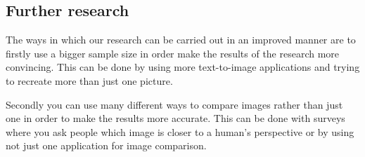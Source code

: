 \documentclass[]{report}
\begin{document}
	\subsection{Further research}
	
	The ways in which our research can be carried out in an improved manner are to firstly use a bigger sample size in order make the results of the research more convincing. This can be done by using more text-to-image applications and trying to recreate more than just one picture. 
	
	Secondly you can use many different ways to compare images rather than just one in order to make the results more accurate. This can be done with surveys where you ask people which image is closer to a human’s perspective or by using not just one application for image comparison.
	
	\newpage
	\printbibliography[title=References]
	
\end{document}
